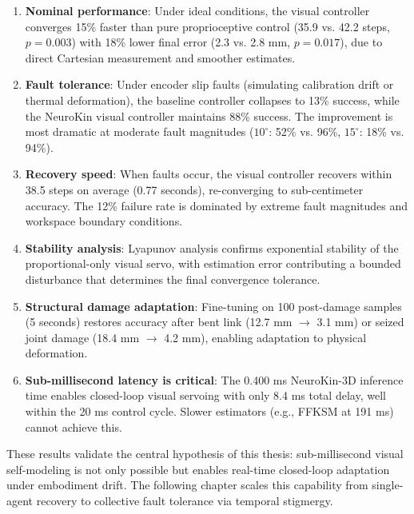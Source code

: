 \documentclass[12pt,a4paper,oneside]{report}
\begin{document}
\begin{enumerate}
    \item \textbf{Nominal performance}: Under ideal conditions, the visual controller converges 15\% faster than pure proprioceptive control (35.9 vs. 42.2 steps, $p = 0.003$) with 18\% lower final error (2.3 vs. 2.8 mm, $p = 0.017$), due to direct Cartesian measurement and smoother estimates.
    \item \textbf{Fault tolerance}: Under encoder slip faults (simulating calibration drift or thermal deformation), the baseline controller collapses to 13\% success, while the NeuroKin visual controller maintains 88\% success. The improvement is most dramatic at moderate fault magnitudes ($10^\circ$: 52\% vs. 96\%, $15^\circ$: 18\% vs. 94\%).
    \item \textbf{Recovery speed}: When faults occur, the visual controller recovers within 38.5 steps on average (0.77 seconds), re-converging to sub-centimeter accuracy. The 12\% failure rate is dominated by extreme fault magnitudes and workspace boundary conditions.
    \item \textbf{Stability analysis}: Lyapunov analysis confirms exponential stability of the proportional-only visual servo, with estimation error contributing a bounded disturbance that determines the final convergence tolerance.
    \item \textbf{Structural damage adaptation}: Fine-tuning on 100 post-damage samples (5 seconds) restores accuracy after bent link (12.7 mm $\rightarrow$ 3.1 mm) or seized joint damage (18.4 mm $\rightarrow$ 4.2 mm), enabling adaptation to physical deformation.
    \item \textbf{Sub-millisecond latency is critical}: The 0.400 ms NeuroKin-3D inference time enables closed-loop visual servoing with only 8.4 ms total delay, well within the 20 ms control cycle. Slower estimators (e.g., FFKSM at 191 ms) cannot achieve this.
\end{enumerate}

These results validate the central hypothesis of this thesis: sub-millisecond visual self-modeling is not only possible but enables real-time closed-loop adaptation under embodiment drift. The following chapter scales this capability from single-agent recovery to collective fault tolerance via temporal stigmergy.









\end{document}
